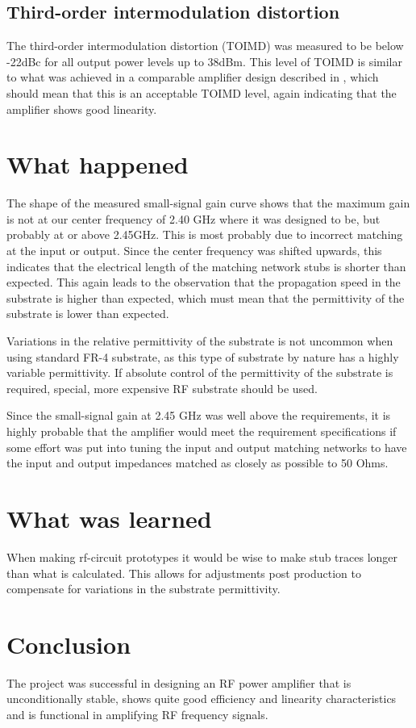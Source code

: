 	\subsection{Third-order intermodulation distortion}
	The third-order intermodulation distortion (TOIMD) was measured to be below -22dBc for all output power levels up to 38dBm. This level of TOIMD is similar to what was achieved in a comparable amplifier design described in \cite{5WLTE}, which should mean that this is an acceptable TOIMD level, again indicating that the amplifier shows good linearity.
  \section{What happened}
  The shape of the measured small-signal gain curve shows that the maximum gain is not at our center frequency of 2.40 GHz where it was designed to be, but probably at or above 2.45GHz. This is most probably due to incorrect matching at the input or output. Since the center frequency was shifted upwards, this indicates that the electrical length of the matching network stubs is shorter than expected. This again leads to the observation that the propagation speed in the substrate is higher than expected, which must mean that the permittivity of the substrate is lower than expected.

  Variations in the relative permittivity of the substrate is not uncommon when using standard FR-4 substrate, as this type of substrate by nature has a highly variable permittivity. If absolute control of the permittivity of the substrate is required, special, more expensive RF substrate should be used.

  Since the small-signal gain at 2.45 GHz was well above the requirements, it is highly probable that the amplifier would meet the requirement specifications if some effort was put into tuning the input and output matching networks to have the input and output impedances matched as closely as possible to 50 Ohms.
  
  \section{What was learned}
  When making rf-circuit prototypes it would be wise to make stub traces longer than what is calculated. This allows for adjustments post production to compensate for variations in the substrate permittivity. 

  \section{Conclusion}
  The project was successful in designing an RF power amplifier that is unconditionally stable, shows quite good efficiency and linearity characteristics and is functional in amplifying RF frequency signals.

